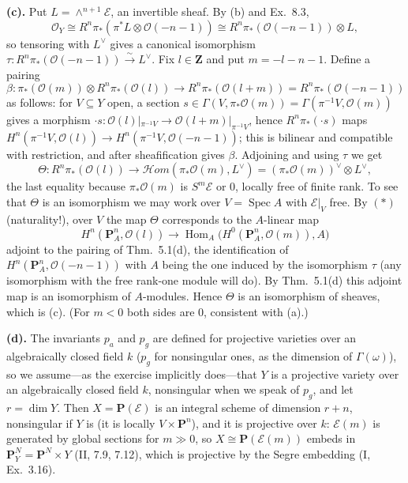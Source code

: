 \documentclass[11pt]{article}
\begin{document}
\textbf{(c).} Put $L=\wedge^{n+1}\mathcal E$, an invertible sheaf. By (b) and Ex.~8.3,
\[
\mathcal O_Y\cong R^n\pi_*(\pi^*L\otimes\mathcal O(-n-1))\cong R^n\pi_*(\mathcal O(-n-1))\otimes L,
\]
so tensoring with $L^\vee$ gives a canonical isomorphism $\tau:R^n\pi_*(\mathcal O(-n-1))\xrightarrow{\sim}L^\vee$. Fix $l\in\mathbf Z$ and put $m=-l-n-1$. Define a pairing
\[
\beta:\pi_*(\mathcal O(m))\otimes R^n\pi_*(\mathcal O(l))\longrightarrow R^n\pi_*(\mathcal O(l+m))=R^n\pi_*(\mathcal O(-n-1))
\]
as follows: for $V\subseteq Y$ open, a section $s\in\Gamma(V,\pi_*\mathcal O(m))=\Gamma(\pi^{-1}V,\mathcal O(m))$ gives a morphism $\cdot s:\mathcal O(l)|_{\pi^{-1}V}\to\mathcal O(l+m)|_{\pi^{-1}V}$, hence $R^n\pi_*(\cdot s)$ maps $H^n(\pi^{-1}V,\mathcal O(l))\to H^n(\pi^{-1}V,\mathcal O(-n-1))$; this is bilinear and compatible with restriction, and after sheafification gives $\beta$. Adjoining and using $\tau$ we get
\[
\Theta:R^n\pi_*(\mathcal O(l))\to\mathcal{H}om(\pi_*\mathcal O(m),L^\vee)=(\pi_*\mathcal O(m))^\vee\otimes L^\vee ,
\]
the last equality because $\pi_*\mathcal O(m)$ is $S^m\mathcal E$ or $0$, locally free of finite rank. To see that $\Theta$ is an isomorphism we may work over $V=\operatorname{Spec}A$ with $\mathcal E|_V$ free. By $(*)$ (naturality!), over $V$ the map $\Theta$ corresponds to the $A$-linear map
\[
H^n(\mathbf P^n_A,\mathcal O(l))\to\operatorname{Hom}_A\bigl(H^0(\mathbf P^n_A,\mathcal O(m)),A\bigr)
\]
adjoint to the pairing of Thm.~5.1(d), the identification of $H^n(\mathbf P^n_A,\mathcal O(-n-1))$ with $A$ being the one induced by the isomorphism $\tau$ (any isomorphism with the free rank-one module will do). By Thm.~5.1(d) this adjoint map is an isomorphism of $A$-modules. Hence $\Theta$ is an isomorphism of sheaves, which is (c). (For $m<0$ both sides are $0$, consistent with (a).)

\textbf{(d).} The invariants $p_a$ and $p_g$ are defined for projective varieties over an algebraically closed field $k$ ($p_g$ for nonsingular ones, as the dimension of $\Gamma(\omega)$), so we assume---as the exercise implicitly does---that $Y$ is a projective variety over an algebraically closed field $k$, nonsingular when we speak of $p_g$, and let $r=\dim Y$. Then $X=\mathbf P(\mathcal E)$ is an integral scheme of dimension $r+n$, nonsingular if $Y$ is (it is locally $V\times\mathbf P^n$), and it is projective over $k$: $\mathcal E(m)$ is generated by global sections for $m\gg0$, so $X\cong\mathbf P(\mathcal E(m))$ embeds in $\mathbf P^N_Y=\mathbf P^N\times Y$ (II, 7.9, 7.12), which is projective by the Segre embedding (I, Ex.~3.16).
\end{document}
